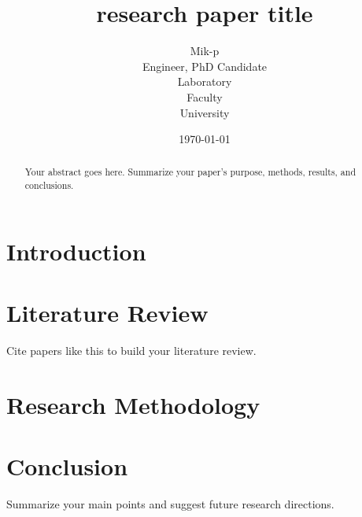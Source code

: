\documentclass[12pt, a4paper]{article}
\title{
\textbf{research paper title} \\
}
\author{
Mik-p\\
Engineer, PhD Candidate\\
Laboratory \\
Faculty \\
University \\
}
\date{\today}
\begin{document}
\maketitle
\newpage

\begin{abstract}
    Your abstract goes here. Summarize your paper's purpose, methods, results, and conclusions.
\end{abstract}
\newpage

\tableofcontents

\listoffigures

\listoftables

\newpage

\section{Introduction}

\section{Literature Review}
Cite papers like this \parencite{Brooks1986} to build your literature review.

\section{Research Methodology}


\section{Conclusion}
Summarize your main points and suggest future research directions.

\printbibliography[
    heading=bibintoc,
    title={References}
]

\end{document}
